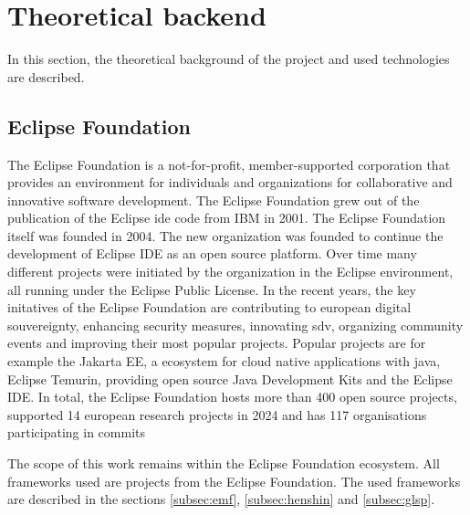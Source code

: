 \section{Theoretical backend}
\label{sec:background}
  In this section, the theoretical background of the project and used technologies are described. 

  \subsection{Eclipse Foundation}
  \label{subsec:eclipse-foundation}
  The Eclipse Foundation is a not-for-profit, member-supported corporation that provides an environment for individuals and organizations for collaborative and innovative software development. \cite{eclipse-review} The Eclipse Foundation grew out of the publication of the Eclipse \ac{ide} code from IBM in 2001. The Eclipse Foundation itself was founded in 2004. The new organization was founded to continue the development of Eclipse IDE as an open source platform. Over time many different projects were initiated by the organization in the Eclipse environment, all running under the Eclipse Public License. \cite{heise-eclipse-foundation,eclipse-review} In the recent years, the key initatives of the Eclipse Foundation are contributing to european digital souvereignty, enhancing security measures, innovating \ac{sdv}, organizing community events and improving their most popular projects. Popular projects are for example the Jakarta EE, a ecosystem for cloud native applications with java, Eclipse Temurin, providing open source Java Development Kits and the Eclipse IDE. \cite{eclipse-report} In total, the Eclipse Foundation hosts more than 400 open source projects, supported 14 european research projects in 2024 and has 117 organisations participating in commits \cite{eclipse-report}

  The scope of this work remains within the Eclipse Foundation ecosystem. All frameworks used are projects from the Eclipse Foundation. The used frameworks are described in the sections \ref{subsec:emf}, \ref{subsec:henshin} and \ref{subsec:glsp}.

